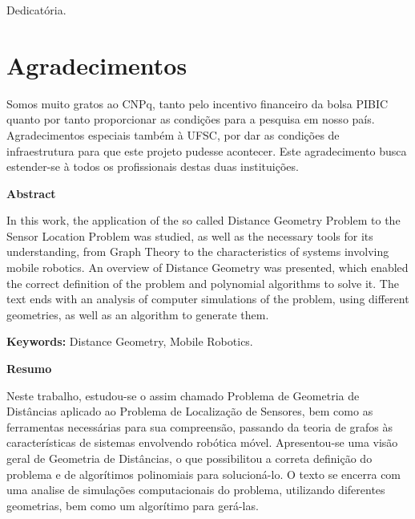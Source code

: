 \documentclass[a4paper,12pt]{report}
\theoremstyle{plain}
\theoremstyle{definition}
\begin{document}
	\newpage
	\vspace*{\fill}
	\begin{flushright}
		Dedicatória.
	\end{flushright}
	
	\newpage
	
	\chapter*{Agradecimentos}
	
	Somos muito gratos ao CNPq, tanto pelo incentivo financeiro da bolsa PIBIC quanto por tanto proporcionar as condições para a pesquisa em nosso país. Agradecimentos especiais também à UFSC, por dar as condições de infraestrutura para que este projeto pudesse acontecer. Este agradecimento busca estender-se à todos os profissionais destas duas instituições.
	
	\newpage
	\tableofcontents
	\newpage
	
	\begin{center}
		\large
		\textbf{Abstract}
	\end{center}
	
	
	In this work, the application of the so called Distance Geometry Problem to the Sensor Location Problem was studied, as well as the necessary tools for its understanding, from Graph Theory to the characteristics of systems involving mobile robotics. An overview of Distance Geometry was presented, which enabled the correct definition of the problem and polynomial algorithms to solve it. The text ends with an analysis of computer simulations of the problem, using different geometries, as well as an algorithm to generate them.
	
	\textbf{Keywords:} Distance Geometry, Mobile Robotics.
	
	
	\vspace{2cm}	
	\begin{center}
		\large
		\textbf{Resumo}
	\end{center}
	
	Neste trabalho, estudou-se o assim chamado Problema de Geometria de Distâncias aplicado ao Problema de Localização de Sensores, bem como as ferramentas necessárias para sua compreensão, passando da teoria de grafos às características de sistemas envolvendo robótica móvel. Apresentou-se uma visão geral de Geometria de Distâncias, o que possibilitou a correta definição do problema e de algorítimos polinomiais para solucioná-lo. O texto se encerra com uma analise de simulações computacionais do problema, utilizando diferentes geometrias, bem como um algorítimo para gerá-las. 
	
\end{document}
